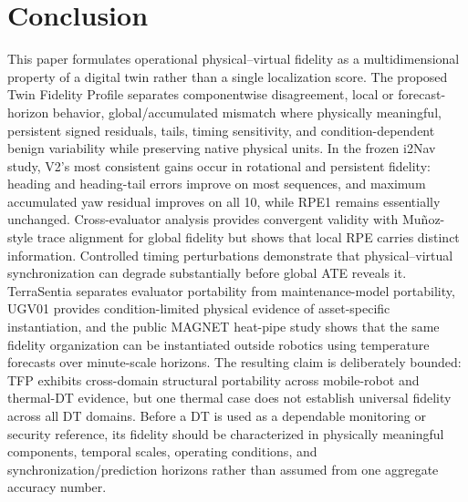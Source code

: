 \documentclass[journal]{IEEEtran}
\begin{document}
\section{Conclusion}
This paper formulates operational physical--virtual fidelity as a multidimensional property of a digital twin rather than a single localization score. The proposed Twin Fidelity Profile separates componentwise disagreement, local or forecast-horizon behavior, global/accumulated mismatch where physically meaningful, persistent signed residuals, tails, timing sensitivity, and condition-dependent benign variability while preserving native physical units. In the frozen i2Nav study, V2's most consistent gains occur in rotational and persistent fidelity: heading and heading-tail errors improve on most sequences, and maximum accumulated yaw residual improves on all 10, while RPE1 remains essentially unchanged. Cross-evaluator analysis provides convergent validity with Mu\~noz-style trace alignment for global fidelity but shows that local RPE carries distinct information. Controlled timing perturbations demonstrate that physical--virtual synchronization can degrade substantially before global ATE reveals it. TerraSentia separates evaluator portability from maintenance-model portability, UGV01 provides condition-limited physical evidence of asset-specific instantiation, and the public MAGNET heat-pipe study shows that the same fidelity organization can be instantiated outside robotics using temperature forecasts over minute-scale horizons. The resulting claim is deliberately bounded: TFP exhibits cross-domain structural portability across mobile-robot and thermal-DT evidence, but one thermal case does not establish universal fidelity across all DT domains. Before a DT is used as a dependable monitoring or security reference, its fidelity should be characterized in physically meaningful components, temporal scales, operating conditions, and synchronization/prediction horizons rather than assumed from one aggregate accuracy number.
\end{document}
